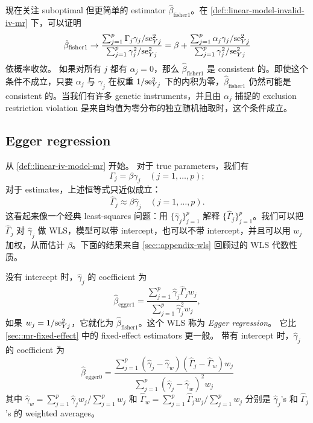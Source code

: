 现在关注 suboptimal 但更简单的 estimator $\hat{\beta}_{\text{fisher}1}$。在 \cref{def::linear-model-invalid-iv-mr} 下，可以证明
$$
\hat{\beta}_{\text{fisher}1}  \rightarrow 
\frac{ \sum_{j=1}^p   \Gamma_j    \gamma_j /  \textup{se}_{Yj}^2 }{ \sum_{j=1}^p    \gamma_j^2 /  \textup{se}_{Yj}^2 }
= \beta + \frac{ \sum_{j=1}^p   \alpha_j    \gamma_j /  \textup{se}_{Yj}^2 }{ \sum_{j=1}^p    \gamma_j^2 /  \textup{se}_{Yj}^2 }
$$
依概率收敛。
如果对所有 $j$ 都有 $\alpha_j = 0$，那么 $\hat{\beta}_{\text{fisher}1} $ 是 consistent 的。即使这个条件不成立，只要 $\alpha_j$ 与 $\gamma_j$ 在权重 $1/  \textup{se}_{Yj}^2$ 下的内积为零，$\hat{\beta}_{\text{fisher}1}$ 仍然可能是 consistent 的。当我们有许多 genetic instruments，并且由 $\alpha_j$ 捕捉的 exclusion restriction violation 是来自均值为零分布的独立随机抽取时，这个条件成立。


\subsection{Egger regression}


从 \cref{def::linear-iv-model-mr} 开始。
对于 true parameters，我们有
$$
\Gamma_j = \beta \gamma_j \quad (j=1,\ldots, p);
$$
对于 estimates，上述恒等式只近似成立：
$$
\hat \Gamma_j \approx  \beta \hat \gamma_j \quad (j=1,\ldots, p).
$$
这看起来像一个经典 least-squares 问题：用 $\{\hat \gamma_j \}_{j=1}^p$ 解释 $\{\hat \Gamma_j \}_{j=1}^p$。我们可以把 $\hat \Gamma_j$ 对 $\hat \gamma_j$ 做 WLS，模型可以带 intercept，也可以不带 intercept，并且可以用 $w_j$ 加权，从而估计 $\beta$。下面的结果来自 \cref{sec::appendix-wls} 回顾过的 WLS 代数性质。


没有 intercept 时，$\hat \gamma_j$ 的 coefficient 为
$$
\hat{\beta}_{\text{egger}1}  = \frac{  \sum_{j=1}^p  \hat \gamma_j  \hat \Gamma_j w_j     }{ \sum_{j=1}^p  \hat \gamma_j ^2 w_j },
$$
如果 $w_j =  1/\textup{se}_{Yj}^2$，它就化为 $\hat{\beta}_{\text{fisher}1} $。这个 WLS 称为 {\it Egger regression}。
它比 \cref{sec::mr-fixed-effect} 中的 fixed-effect estimators 更一般。
带有 intercept 时，$\hat \gamma_j$ 的 coefficient 为
$$
\hat{\beta}_{\text{egger}0}  =  \frac{  \sum_{j=1}^p  (\hat \gamma_j  - \hat \gamma_w) (\hat \Gamma_j - \hat \Gamma_w) w_j     }
{ \sum_{j=1}^p  (\hat \gamma_j  - \hat \gamma_w) ^2 w_j }
$$
其中 $\hat \gamma_w = \sum_{j=1}^p \hat \gamma_j w_j /  \sum_{j=1}^p   w_j  $ 和 $\hat \Gamma_w = \sum_{j=1}^p \hat \Gamma_j w_j /  \sum_{j=1}^p   w_j  $ 分别是 $\hat \gamma_j$'s 和 $\hat \Gamma_j$'s 的 weighted averages。





